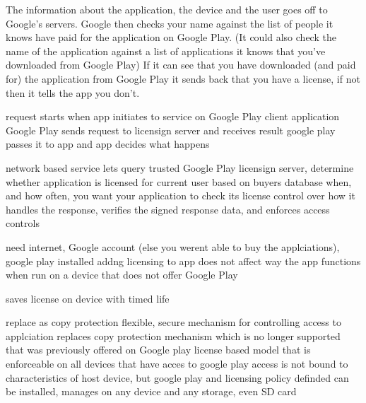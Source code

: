 The information about the application, the device and the user goes off to Google's servers.
Google then checks your name against the list of people it knows have paid for the application on Google Play. (It could also check the name of the application against a list of applications it knows that you've downloaded from Google Play)
If it can see that you have downloaded (and paid for) the application from Google Play it sends back that you have a license, if not then it tells the app you don't.

%
request starts when app initiates to service on Google Play client application
Google Play sends request to licensign server and receives result
google play passes it to app and app decides what happens
\cite{developersLicensingOverview}
%


%
network based service lets query trusted Google Play licensign server, determine whether application is licensed for current user based on buyers database
when, and how often, you want your application to check its license
control over how it handles the response, verifies the signed response data, and enforces access controls

need internet, Google account (else you werent able to buy the applciations), google play installed
addng licensing to app does not affect way the app functions when run on a device that does not offer Google Play

saves license on device with timed life

replace as copy protection
flexible, secure mechanism for controlling access to applciation
replaces copy protection mechanism which is no longer supported that was previously offered on Google play
license based model that is enforceable on all devices that have acces to google play
access is not bound to characteristics of host device, but google play and licensing policy definded
can be installed, manages on any device and any storage, even SD card
\cite{developersLicensingOverview}
%
